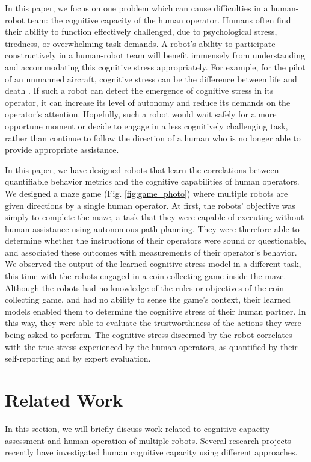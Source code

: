 \documentclass{sig-alternate}
\begin{document}
In this paper, we focus on one problem which can cause difficulties in
a human-robot team: the cognitive capacity of the human operator.
Humans often find their ability to function effectively challenged,
due to psychological stress, tiredness, or overwhelming task demands.
A robot's ability to participate constructively in a human-robot team
will benefit immensely from understanding and accommodating this
cognitive stress appropriately.  For example, for the pilot of an
unmanned aircraft, cognitive stress can be the difference between life
and death \cite{crandall2005validating}.  If such a robot can detect
the emergence of cognitive stress in its operator, it can increase its
level of autonomy and reduce its demands on the operator's attention.
Hopefully, such a robot would wait safely for a more opportune moment
or decide to engage in a less cognitively challenging task, rather
than continue to follow the direction of a human who is no longer able
to provide appropriate assistance.

In this paper, we have designed robots that learn the correlations
between quantifiable behavior metrics and the cognitive capabilities
of human operators.  We designed a maze game
(Fig. \ref{fig:game_photo}) where multiple robots are given directions
by a single human operator.  At first, the robots' objective was
simply to complete the maze, a task that they were capable of
executing without human assistance using autonomous path planning.
They were therefore able to determine whether the instructions of
their operators were sound or questionable, and associated these
outcomes with measurements of their operator's behavior.  We observed
the output of the learned cognitive stress model in a different task,
this time with the robots engaged in a coin-collecting game inside the
maze.  Although the robots had no knowledge of the rules or objectives
of the coin-collecting game, and had no ability to sense the game's
context, their learned models enabled them to determine the cognitive
stress of their human partner.  In this way, they were able to
evaluate the trustworthiness of the actions they were being asked to
perform.  The cognitive stress discerned by the robot correlates with
the true stress experienced by the human operators, as quantified by
their self-reporting and by expert evaluation.

\section{Related Work}
In this section, we will briefly discuss work related to cognitive
capacity assessment and human operation of multiple robots.  Several
research projects recently have investigated human cognitive capacity
using different approaches.
\end{document}
